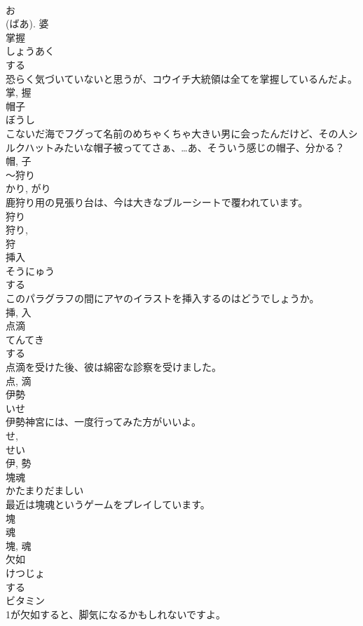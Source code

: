 \documentclass[8pt]{extreport}
\begin{document}
\begin{CJK}{UTF8}{min}
\\	お 
\\	(ばあ).	婆	
\\	掌握	
\\	しょうあく	
\\	する 
\\	恐らく気づいていないと思うが、コウイチ大統領は全てを掌握しているんだよ。	
\\	掌, 握	
\\	帽子	
\\	ぼうし	
\\	こないだ海でフグって名前のめちゃくちゃ大きい男に会ったんだけど、その人シルクハットみたいな帽子被っててさぁ、…あ、そういう感じの帽子、分かる？	
\\	帽, 子	
\\	〜狩り	
\\	かり, がり	
\\	鹿狩り用の見張り台は、今は大きなブルーシートで覆われています。	
\\	狩り 
\\	狩り, 
\\	狩	
\\	挿入	
\\	そうにゅう	
\\	する 
\\	このパラグラフの間にアヤのイラストを挿入するのはどうでしょうか。	
\\	挿, 入	
\\	点滴	
\\	てんてき	
\\	する 
\\	点滴を受けた後、彼は綿密な診察を受けました。	
\\	点, 滴	
\\	伊勢	
\\	いせ	
\\	伊勢神宮には、一度行ってみた方がいいよ。	
\\	せ, 
\\	せい 
\\	伊, 勢	
\\	塊魂	
\\	かたまりだましい	
\\	最近は塊魂というゲームをプレイしています。	
\\	塊 
\\	魂 
\\	塊, 魂	
\\	欠如	
\\	けつじょ	
\\	する 
\\	ビタミン
\\	1が欠如すると、脚気になるかもしれないですよ。	

\end{CJK}
\end{document}
